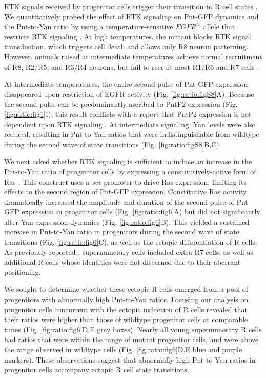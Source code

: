 RTK signals received by progenitor cells trigger their transition to R cell states \cite{Freeman1996}. We quantitatively probed the effect of RTK signaling on Pnt-GFP dynamics and the Pnt-to-Yan ratio by using a temperature-sensitive $EGFR^{ts}$ allele that restricts RTK signaling \cite{Kumar1998}. At high temperatures, the mutant blocks RTK signal transduction, which triggers cell death and allows only R8 neuron patterning. However, animals raised at intermediate temperatures achieve normal recruitment of R8, R2/R5, and R3/R4 neurons, but fail to recruit most R1/R6 and R7 cells \cite{Pelaez2015a}.

At intermediate temperatures, the entire second pulse of Pnt-GFP expression disappeared upon restriction of EGFR activity (Fig. \ref{fig:ratio:figS8}A). Because the second pulse can be predominantly ascribed to PntP2 expression (Fig. \ref{fig:ratio:fig1}I), this result conflicts with a report that PntP2 expression is not dependent upon RTK signaling \cite{Shwartz2013}. At intermediate signaling, Yan levels were also reduced, resulting in Pnt-to-Yan ratios that were indistinguishable from wildtype during the second wave of state transitions (Fig. \ref{fig:ratio:figS8}B,C).

We next asked whether RTK signaling is sufficient to induce an increase in the Pnt-to-Yan ratio of progenitor cells by expressing a constitutively-active form of Ras \cite{Simon1991,Fortini1992}. This construct uses a \textit{sev} promoter to drive Ras expression, limiting its effects to the second region of Pnt-GFP expression. Constitutive Ras activity dramatically increased the amplitude and duration of the second pulse of Pnt-GFP expression in progenitor cells (Fig. \ref{fig:ratio:fig6}A) but did not significantly alter Yan expression dynamics (Fig. \ref{fig:ratio:fig6}B). This yielded a sustained increase in Pnt-to-Yan ratio in progenitors during the second wave of state transitions (Fig. \ref{fig:ratio:fig6}C), as well as the ectopic differentiation of R cells. As previously reported \cite{Fortini1992}, supernumerary cells included extra R7 cells, as well as additional R cells whose identities were not discerned due to their aberrant positioning.

We sought to determine whether these ectopic R cells emerged from a pool of progenitors with abnormally high Pnt-to-Yan ratios. Focusing our analysis on progenitor cells concurrent with the ectopic induction of R cells revealed that their ratios were higher than those of wildtype progenitor cells at comparable times (Fig. \ref{fig:ratio:fig6}D,E grey boxes). Nearly all young supernumerary R cells had ratios that were within the range of mutant progenitor cells, and were above the range observed in wildtype cells (Fig. \ref{fig:ratio:fig6}D,E blue and purple markers). These observations suggest that abnormally high Pnt-to-Yan ratios in progenitor cells accompany ectopic R cell state transitions.

